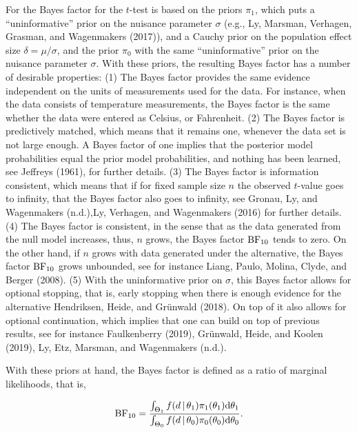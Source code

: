 \documentclass[english,,doc,floatsintext]{apa6}
\begin{document}
For the Bayes factor for the \(t\)-test is based on the priors \(\pi_{1}\), which puts a \enquote{uninformative} prior on the nuisance parameter \(\sigma\) (e.g., Ly, Marsman, Verhagen, Grasman, and Wagenmakers (2017)), and a Cauchy prior on the population effect size \(\delta = \mu / \sigma\), and the prior \(\pi_{0}\) with the same \enquote{uninformative} prior on the nuisance parameter \(\sigma\). With these priors, the resulting Bayes factor has a number of desirable properties: (1) The Bayes factor provides the same evidence independent on the units of measurements used for the data. For instance, when the data consists of temperature measurements, the Bayes factor is the same whether the data were entered as Celsius, or Fahrenheit. (2) The Bayes factor is predictively matched, which means that it remains one, whenever the data set is not large enough. A Bayes factor of one implies that the posterior model probabilities equal the prior model probabilities, and nothing has been learned, see Jeffreys (1961), for further details. (3) The Bayes factor is information consistent, which means that if for fixed sample size \(n\) the observed \(t\)-value goes to infinity, that the Bayes factor also goes to infinity, see Gronau, Ly, and Wagenmakers (n.d.),Ly, Verhagen, and Wagenmakers (2016) for further details. (4) The Bayes factor is consistent, in the sense that as the data generated from the null model increases, thus, \(n\) grows, the Bayes factor \(\textnormal{BF}_{10}\) tends to zero. On the other hand, if \(n\) grows with data generated under the alternative, the Bayes factor \(\textnormal{BF}_{10}\) grows unbounded, see for instance Liang, Paulo, Molina, Clyde, and Berger (2008). (5) With the uninformative prior on \(\sigma\), this Bayes factor allows for optional stopping, that is, early stopping when there is enough evidence for the alternative Hendriksen, Heide, and Grünwald (2018). On top of it also allows for optional continuation, which implies that one can build on top of previous results, see for instance Faulkenberry (2019), Grünwald, Heide, and Koolen (2019), Ly, Etz, Marsman, and Wagenmakers (n.d.).

With these priors at hand, the Bayes factor is defined as a ratio of marginal likelihoods, that is,

\begin{align}
\textnormal{BF}_{10} = \frac{ \int_{\Theta_{1}} f(d \, | \, \theta_{1}) \pi_{1}(\theta_{1}) \textnormal{d} \theta_{1}}{\int_{\Theta_{0}} f(d \, | \, \theta_{0}) \pi_{0}(\theta_{0}) \textnormal{d} \theta_{0}}.
\end{align}
\end{document}
